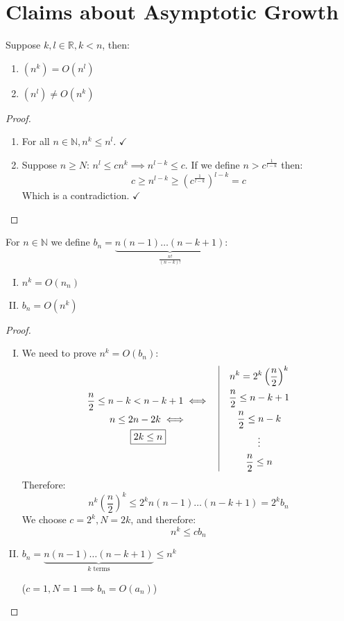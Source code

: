 \documentclass[00_complete]{subfiles}
\begin{document}
\section{Claims about Asymptotic Growth}
\begin{claim}
    Suppose $k,l \in \mathbb{R}, k<n$, then:
    \begin{enumerate}
        \item $(n^k) = O(n^l)$
        \item $(n^l) \neq O(n^k)$
    \end{enumerate}
\end{claim}
\begin{proof}
    \begin{enumerate}
        \item For all $n \in \mathbb{N}, n^k \leq n^l$. $\checkmark$
        \item Suppose $n \geq N$: $n^l \leq cn^k \implies n^{l-k}\leq c$. If we
            define $n>c^\frac{1}{l-k}$ then:
            $$c \geq n^{l-k}\geq \left(c^{\frac{1}{l-k}}\right)^{l-k} = c$$
            Which is a contradiction. $\checkmark$
    \end{enumerate}
\end{proof}
\begin{claim}
    For $n \in \mathbb{N}$ we define
    $b_n=\underbrace{n(n-1)\dots(n-k+1)}_{\frac{n!}{(n-k)!}}$:
    \begin{enumerate}[I.]
        \item $n^k = O(n_n)$
        \item $b_n = O(n^k)$
    \end{enumerate}
\end{claim}
\begin{proof}
    \begin{enumerate}[I.]
        \item We need to prove $n^k = O(b_n)$:
            $$
            \begin{gathered}
                \frac{n}{2} \leq n-k<n-k+1 \iff \\
                n\leq 2n-2k \iff \\ \boxed{2k\leq n}
            \end{gathered} \quad \vline \quad
            \begin{gathered}
                n^k=2^k\left(\frac{n}{2}\right)^k \\
                \frac{n}{2} \leq n-k+1 \\
                \frac{n}{2}\leq n-k \\ \vdots \\
                \frac{n}{2} \leq n
            \end{gathered}
            $$
            Therefore:
            $$n^k\left(\frac{n}{2}\right)^k \leq 2^kn(n-1)\dots(n-k+1) = 2^kb_n$$
            We choose $c=2^k, N=2k$, and therefore:
            $$n^k\leq cb_n$$
        \item $b_n= \underbrace{n(n-1)\dots(n-k+1)}_{k \text{ terms}} \leq n^k$

            ($c=1, N=1 \implies b_n=O(a_n)$)
    \end{enumerate}
\end{proof}
\end{document}
